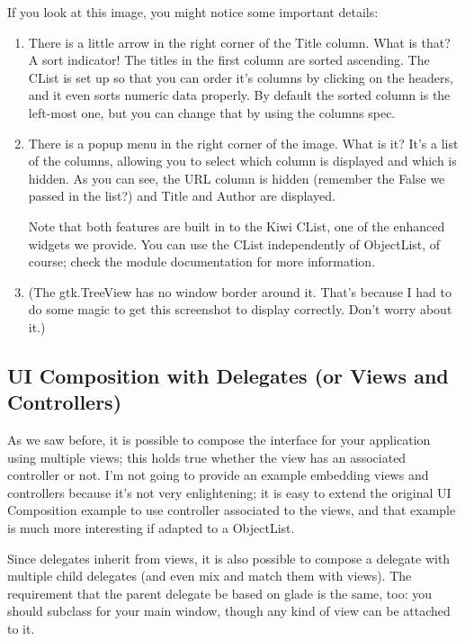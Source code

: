 \documentclass[a4paper]{howto}
\begin{document}
If you look at this image, you might notice some important details:
\begin{enumerate}
\item There is a little arrow in the right corner of the Title column.
What is that? A sort indicator! The titles in the first column are
sorted ascending. The CList is set up so that you can order it's columns
by clicking on the headers, and it even sorts numeric data properly. By
default the sorted column is the left-most one, but you can change that
by using the columns spec.

\item There is a popup menu in the right corner of the image. What is
it? It's a list of the columns, allowing you to select which column is
displayed and which is hidden. As you can see, the URL column is hidden
(remember the False we passed in the  list?) and
Title and Author are displayed.

Note that both features are built in to the Kiwi CList, one of the
enhanced widgets we provide. You can use the CList independently of
ObjectList, of course; check the module documentation for more
information.
\item (The gtk.TreeView has no window border around it. That's because I had to
do some magic to get this screenshot to display correctly. Don't worry
about it.)
\end{enumerate}

\subsection{UI Composition with Delegates (or Views and Controllers)}

As we saw before, it is possible to compose the interface for your
application using multiple views; this holds true whether the view has
an associated controller or not. I'm not going to provide an example
embedding views and controllers because it's not very enlightening; it
is easy to extend the original UI Composition example to use controller
associated to the views, and that example is much more interesting if
adapted to a ObjectList.

Since delegates inherit from views, it is also possible to compose
a delegate with multiple child delegates (and even mix and match them
with views). The requirement that the parent delegate be based on glade
is the same, too: you should subclass  for your
main window, though any kind of view can be attached to it.
\end{document}
